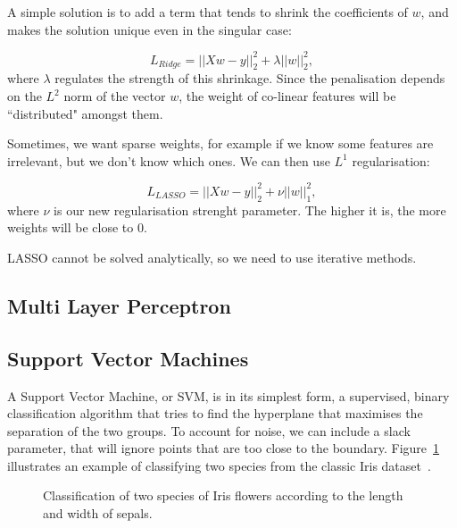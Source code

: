 A simple solution  is to add a term that tends to shrink the coefficients of $w$, and makes the solution unique even in the singular case:

\[ L_{Ridge} = || X w -y ||_2 ^2 + \lambda ||w||_2^2,\]
where $\lambda$ regulates the strength of this shrinkage.
Since the penalisation depends on the $L^2$ norm of the vector $w$, the weight of co-linear features will be ``distributed" amongst them.

Sometimes, we want sparse weights,  for example if we know some features are irrelevant, but we don't know which ones.
We can then use $L^1$ regularisation:

\[ L_{LASSO} = || X w -y ||_2 ^2 + \nu ||w||_1^2,\]
where $\nu$ is our new regularisation strenght parameter.
The higher it is, the more weights will be close to $0$.

LASSO cannot be solved analytically, so we need to use iterative methods.

\subsection{Multi Layer Perceptron}
\subsection{Support Vector Machines}
A Support Vector Machine, or SVM, is in its simplest form, a supervised, binary classification algorithm that tries to find the hyperplane that maximises the separation of the two groups.
To account for noise, we can include a slack parameter, that will ignore points that are too close to the boundary.
Figure~\ref{fig:svm} illustrates an example of classifying two species from the classic Iris dataset~\citep{iris_dataset}.


\begin{figure}
\centering
{}%
\hfill
{}%
\caption{Classification of two species of Iris flowers according to the length and width of sepals.}\label{fig:svm}
\end{figure}

